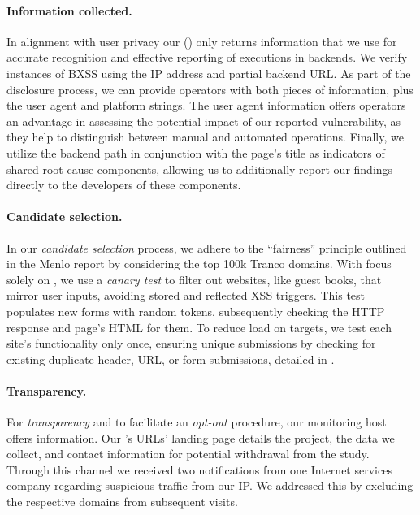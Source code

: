 \vspace{-1em}\paragraph{Information collected.} %
In alignment with user privacy our \ourscriptname{} () only returns information that we use for accurate recognition and effective reporting of \blindxss{} executions in backends.
We verify instances of BXSS using the IP address and partial backend URL\@.
As part of the disclosure process, we can provide operators with both pieces of information, plus the user agent and platform strings.
The user agent information offers operators an advantage in assessing the potential impact of our reported vulnerability, as they help to distinguish between manual and automated operations.
Finally, we utilize the backend path in conjunction with the page's title as indicators of shared root-cause components, allowing us to additionally report our findings directly to the developers of these components.

\vspace{-1em}\paragraph{Candidate selection.} %
In our \emph{candidate selection} process, we adhere to the ``fairness'' principle outlined in the Menlo report by considering the top 100k Tranco domains.
With focus solely on \blindxss{}, we use a \emph{canary test} to filter out websites, like guest books, that mirror user inputs, avoiding stored and reflected XSS triggers. This test populates new forms with random tokens, subsequently checking the HTTP response and page's HTML for them. To reduce load on targets, we test each site's functionality only once, ensuring unique submissions by checking for existing duplicate header, URL, or form submissions, detailed in .

\vspace{-1em}\paragraph{Transparency.}
For \textit{transparency} and to facilitate an \textit{opt-out} procedure, our monitoring host offers information. %
Our \ourscriptname{}'s URLs' landing page details the project,  the data we collect, and contact information for potential withdrawal from the study.
Through this channel we received two notifications from one Internet services company regarding suspicious traffic from our IP\@.
We addressed this by excluding the respective domains from subsequent visits.

